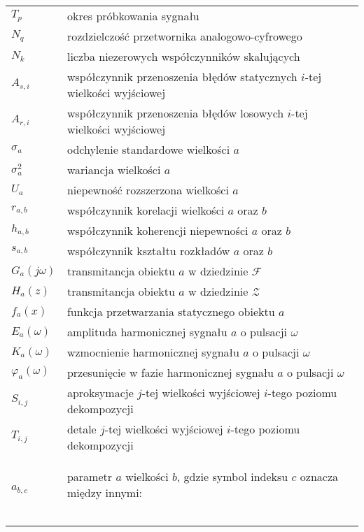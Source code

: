 \begin{longtable}[l]{ l @{~~--~~} p{368pt} }
$T_{p}$                         & okres próbkowania sygnału \\
$N_{q}$                         & rozdzielczość przetwornika analogowo-cyfrowego \\
$N_{k}$                         & liczba niezerowych współczynników skalujących \\
$A_{s,i}$                       & współczynnik przenoszenia błędów statycznych $i$-tej wielkości wyjściowej \\
$A_{r,i}$                       & współczynnik przenoszenia błędów losowych $i$-tej wielkości wyjściowej \\
$\sigma_{a}$                    & odchylenie standardowe wielkości $a$ \\
$\sigma_{a}^{2}$                & wariancja wielkości $a$ \\
$U_{a}$                         & niepewność rozszerzona wielkości $a$ \\
$r_{a,b}$                       & współczynnik korelacji wielkości $a$ oraz $b$ \\
$h_{a,b}$                       & współczynnik koherencji niepewności $a$ oraz $b$ \\
$s_{a,b}$                       & współczynnik kształtu rozkładów $a$ oraz $b$ \\
$G_{a}(j\omega)$                & transmitancja obiektu $a$ w dziedzinie $\mathcal{F}$ \\
$H_{a}(z)$                      & transmitancja obiektu $a$ w dziedzinie $\mathcal{Z}$ \\
$f_{a}(x)$                      & funkcja przetwarzania statycznego obiektu $a$ \\
$E_{a}(\omega)$                 & amplituda harmonicznej sygnału $a$ o pulsacji $\omega$ \\
$K_{a}(\omega)$                 & wzmocnienie harmonicznej sygnału $a$ o pulsacji $\omega$ \\
$\varphi_{a}(\omega)$           & przesunięcie w fazie harmonicznej sygnału $a$ o pulsacji $\omega$ \\
$S_{i,j}$                       & aproksymacje $j$-tej wielkości wyjściowej $i$-tego poziomu dekompozycji \\
$T_{i,j}$                       & detale $j$-tej wielkości wyjściowej $i$-tego poziomu dekompozycji \\
$a_{b,c}$                       & parametr $a$ wielkości $b$, gdzie symbol indeksu $c$ oznacza między innymi: \newline
                                  \begin{tabular}{ *{3}{l @{~--~} l} }

\end{tabular}
\end{longtable}
